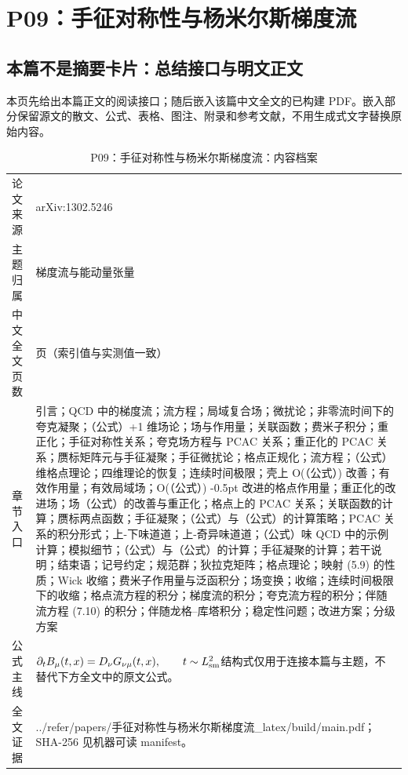 \documentclass[UTF8,11pt,oneside]{ctexbook}
\begin{document}
\chapter{P09：手征对称性与杨米尔斯梯度流}
\section*{本篇不是摘要卡片：总结接口与明文正文}
本页先给出本篇正文的阅读接口；随后嵌入该篇中文全文的已构建 PDF。嵌入部分保留源文的散文、公式、表格、图注、附录和参考文献，不用生成式文字替换原始内容。
\begin{table}[htbp]
  \centering
  \caption{P09：手征对称性与杨米尔斯梯度流：内容档案}
  \small
  \begin{tabularx}{0.96\textwidth}{@{}p{3.3cm}>{\raggedright\arraybackslash}X@{}}
    \toprule
    论文来源 & arXiv:1302.5246 \\
    主题归属 & 梯度流与能动量张量 \\
    中文全文页数 & 34 页（索引值与实测值一致） \\
    章节入口 & 引言；QCD 中的梯度流；流方程；局域复合场；微扰论；非零流时间下的夸克凝聚；（公式）+1 维场论；场与作用量；关联函数；费米子积分；重正化；手征对称性关系；夸克场方程与 PCAC 关系；重正化的 PCAC 关系；赝标矩阵元与手征凝聚；手征微扰论；格点正规化；流方程；（公式）维格点理论；四维理论的恢复；连续时间极限；壳上 O(（公式）) 改善；有效作用量；有效局域场；O(（公式）) -0.5pt 改进的格点作用量；重正化的改进场；场（公式）的改善与重正化；格点上的 PCAC 关系；关联函数的计算；赝标两点函数；手征凝聚；（公式）与（公式）的计算策略；PCAC 关系的积分形式；上-下味道道；上-奇异味道道；（公式）味 QCD 中的示例计算；模拟细节；（公式）与（公式）的计算；手征凝聚的计算；若干说明；结束语；记号约定；规范群；狄拉克矩阵；格点理论；映射 (5.9) 的性质；Wick 收缩；费米子作用量与泛函积分；场变换；收缩；连续时间极限下的收缩；格点流方程的积分；梯度流的积分；夸克流方程的积分；伴随流方程 (7.10) 的积分；伴随龙格–库塔积分；稳定性问题；改进方案；分级方案 \\
    公式主线 & $\partial_t B_\mu(t,x)=D_\nu G_{\nu\mu}(t,x),\qquad t\sim L_{\rm sm}^{2}$\newline\scriptsize 结构式仅用于连接本篇与主题，不替代下方全文中的原文公式。 \\
    全文证据 & ../\allowbreak{}refer/\allowbreak{}papers/\allowbreak{}手征对称性与杨米尔斯梯度流\_\allowbreak{}latex/\allowbreak{}build/\allowbreak{}main.pdf；SHA-256 见机器可读 manifest。 \\
    \bottomrule
  \end{tabularx}
\end{table}
\end{document}
